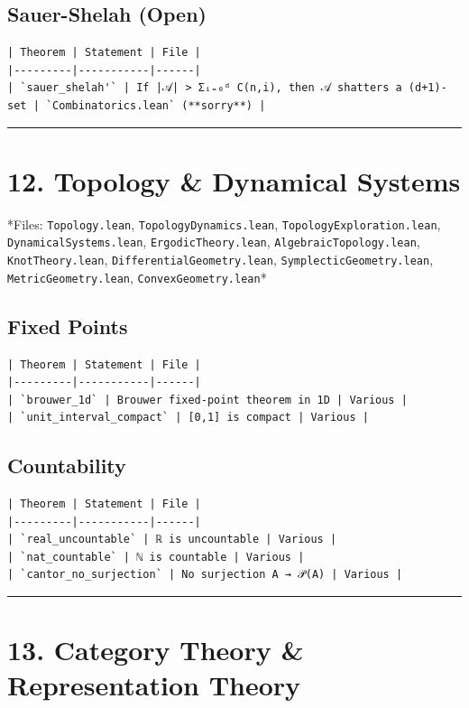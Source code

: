 \documentclass[12pt,a4paper,openany]{book}
\begin{document}
\subsection{Sauer-Shelah (Open)}
\begin{verbatim}
| Theorem | Statement | File |
|---------|-----------|------|
| `sauer_shelah'` | If |𝒜| > Σᵢ₌₀ᵈ C(n,i), then 𝒜 shatters a (d+1)-set | `Combinatorics.lean` (**sorry**) |
\end{verbatim}

\bigskip\hrule\bigskip

\section{12. Topology \& Dynamical Systems}

*Files: \texttt{Topology.lean}, \texttt{TopologyDynamics.lean}, \texttt{TopologyExploration.lean}, \texttt{DynamicalSystems.lean}, \texttt{ErgodicTheory.lean}, \texttt{AlgebraicTopology.lean}, \texttt{KnotTheory.lean}, \texttt{DifferentialGeometry.lean}, \texttt{SymplecticGeometry.lean}, \texttt{MetricGeometry.lean}, \texttt{ConvexGeometry.lean}*

\subsection{Fixed Points}
\begin{verbatim}
| Theorem | Statement | File |
|---------|-----------|------|
| `brouwer_1d` | Brouwer fixed-point theorem in 1D | Various |
| `unit_interval_compact` | [0,1] is compact | Various |
\end{verbatim}

\subsection{Countability}
\begin{verbatim}
| Theorem | Statement | File |
|---------|-----------|------|
| `real_uncountable` | ℝ is uncountable | Various |
| `nat_countable` | ℕ is countable | Various |
| `cantor_no_surjection` | No surjection A → 𝒫(A) | Various |
\end{verbatim}

\bigskip\hrule\bigskip

\section{13. Category Theory \& Representation Theory}
\end{document}

